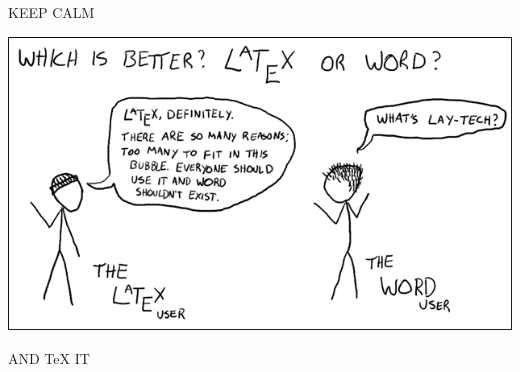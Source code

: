 \documentclass[newPxFont]{beamer}
\begin{document}
\begin{frame}
\centering \alert{\LARGE{ KEEP CALM }}

\vspace{1cm}
\centering \includegraphics[width=0.8\linewidth]{joke_2.png}
\vspace{1cm} 

\centering \alert{\LARGE{ AND \TeX{ } IT }}
\end{frame}
\end{document}
